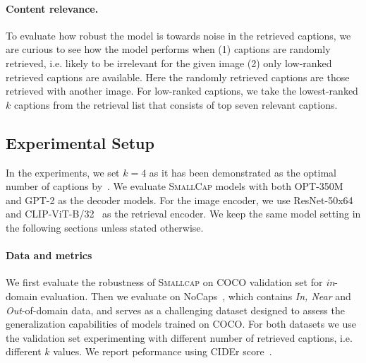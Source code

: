 \paragraph*{Content relevance.}
\label{subsec:content} 
    To evaluate how robust the model is towards noise in the retrieved captions, we are curious to see how the model performs when (1) captions are randomly retrieved, i.e. likely to be irrelevant for the given image (2) only low-ranked retrieved captions are available. Here the randomly retrieved captions are those retrieved with another image. For low-ranked captions, we take the lowest-ranked $k$ captions from the retrieval list that consists of top seven relevant captions. 

\subsection{Experimental Setup} In the experiments, we set $k=4$ as it has been demonstrated as the optimal number of captions by~\citet{ramos2023smallcap}. We evaluate \textsc{SmallCap} models with both OPT-350M \cite{zhang2022opt} and GPT-2 \cite{gpt2} as the decoder models. For the image encoder, we use ResNet-50x64~\cite{he2016deep} and CLIP-ViT-B/32~\cite{clip} as the retrieval encoder. We keep the same model setting in the following sections unless stated otherwise.

\paragraph*{Data and metrics}
\label{para:order-data}
We first evaluate the robustness of \textsc{Smallcap} on COCO validation set for \textit{in}-domain evaluation. Then we evaluate on NoCaps~\citep{agrawal2019nocaps}, which contains \textit{In, Near} and \textit{Out}-of-domain data, and serves as a challenging dataset designed to assess the generalization capabilities of models trained on COCO. For both datasets we use the validation set experimenting with different number of retrieved captions, i.e. different $k$ values. We report peformance using CIDEr score~\citep{cider}. 
    
